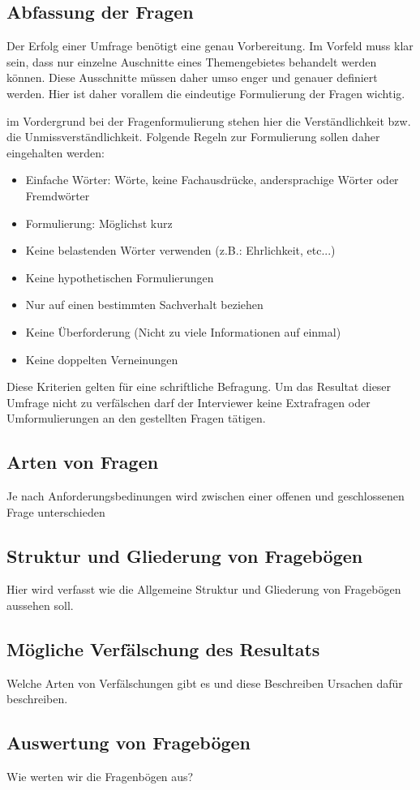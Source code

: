 \subsection{Abfassung der Fragen}
Der Erfolg einer Umfrage benötigt eine genau Vorbereitung. Im Vorfeld muss klar sein,
dass nur einzelne Auschnitte eines Themengebietes behandelt werden können. Diese Ausschnitte
müssen daher umso enger und genauer definiert werden. Hier ist daher vorallem die eindeutige
Formulierung der Fragen wichtig.

im Vordergrund bei der Fragenformulierung stehen hier die Verständlichkeit bzw. die Unmissverständlichkeit.
Folgende Regeln zur Formulierung sollen daher eingehalten werden:
\begin{itemize}
    \item Einfache Wörter: Wörte, keine Fachausdrücke, andersprachige Wörter oder Fremdwörter
    \item Formulierung: Möglichst kurz
    \item Keine belastenden Wörter verwenden (z.B.: Ehrlichkeit, etc...)
    \item Keine hypothetischen Formulierungen
    \item Nur auf einen bestimmten Sachverhalt beziehen
    \item Keine Überforderung (Nicht zu viele Informationen auf einmal)
    \item Keine doppelten Verneinungen
\end{itemize}

Diese Kriterien gelten für eine schriftliche Befragung. Um das Resultat dieser Umfrage nicht
zu verfälschen darf der Interviewer keine Extrafragen oder Umformulierungen an den gestellten
Fragen tätigen.

\subsection{Arten von Fragen}
Je nach Anforderungsbedinungen wird zwischen einer offenen und geschlossenen Frage unterschieden


\subsection{Struktur und Gliederung von Fragebögen}
Hier wird verfasst wie die Allgemeine Struktur und Gliederung von Fragebögen aussehen soll.

\subsection{Mögliche Verfälschung des Resultats}
Welche Arten von Verfälschungen gibt es und diese Beschreiben
Ursachen dafür beschreiben.

\subsection{Auswertung von Fragebögen}
Wie werten wir die Fragenbögen aus?

